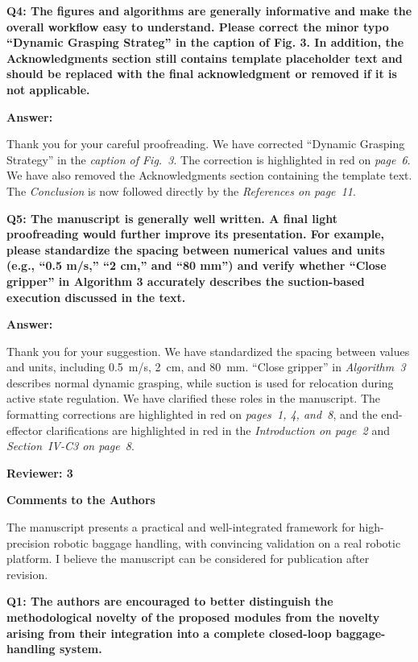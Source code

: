 \documentclass[journal,10pt]{IEEEtran}
\newcommand{\reviewer}[1]{%
  \par\smallskip\noindent
  \textcolor{responseblue}{\textbf{#1\hspace{0.2em}}}\par\nobreak%
}
\newcommand{\question}[2]{%
  \par\smallskip\noindent
  {\color{responseblue}\bfseries\clubpenalty=10000\widowpenalty=10000 Q#1: #2\par}%
  \par\nobreak\noindent
}
\newcommand{\answer}{%
  \par\smallskip\noindent
  \textbf{Answer: }\ignorespaces
}
\newcommand{\reviewercomments}{%
  \par\smallskip\noindent
  {\color{responseblue}\bfseries Comments to the Authors\par\nobreak}%
  \noindent\ignorespaces
}
\begin{document}
\question{4}{The figures and algorithms are generally informative and make the overall workflow easy to understand. Please correct the minor typo “Dynamic Grasping Strateg” in the caption of Fig. 3. In addition, the Acknowledgments section still contains template placeholder text and should be replaced with the final acknowledgment or removed if it is not applicable.}

\answer
Thank you for your careful proofreading. We have corrected ``Dynamic Grasping Strategy'' in the \textit{caption of Fig.~3}. The correction is highlighted in red on \textit{page~6}. We have also removed the Acknowledgments section containing the template text. The \textit{Conclusion} is now followed directly by the \textit{References on page~11}.

\question{5}{The manuscript is generally well written. A final light proofreading would further improve its presentation. For example, please standardize the spacing between numerical values and units (e.g., “0.5 m/s,” “2 cm,” and “80 mm”) and verify whether “Close gripper” in Algorithm 3 accurately describes the suction-based execution discussed in the text.}

\answer
Thank you for your suggestion. We have standardized the spacing between values and units, including 0.5~m/s, 2~cm, and 80~mm. ``Close gripper'' in \textit{Algorithm~3} describes normal dynamic grasping, while suction is used for relocation during active state regulation. We have clarified these roles in the manuscript. The formatting corrections are highlighted in red on \textit{pages~1, 4, and~8}, and the end-effector clarifications are highlighted in red in the \textit{Introduction on page~2} and \textit{Section~IV-C3 on page~8}.

\reviewer{Reviewer: 3}

\reviewercomments
The manuscript presents a practical and well-integrated framework for high-precision robotic baggage handling, with convincing validation on a real robotic platform. I believe the manuscript can be considered for publication after revision.

\question{1}{The authors are encouraged to better distinguish the methodological novelty of the proposed modules from the novelty arising from their integration into a complete closed-loop baggage-handling system.}
\end{document}
